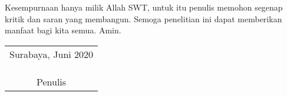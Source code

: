 Kesempurnaan hanya milik Allah SWT, untuk itu penulis memohon segenap kritik dan saran yang  membangun. Semoga penelitian ini dapat memberikan manfaat bagi kita semua. Amin.
\vspace{26pt}

\begin{flushright}
	\begin{tabular}[b]{c}
		Surabaya, Juni 2020
		\\
		\\
		\\
		\\
		Penulis
	\end{tabular}
\end{flushright}